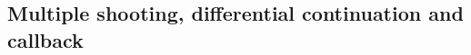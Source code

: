 \documentclass[AMA,STIX1COL]{WileyNJD-v2}
\newcommand{\mybar}[1]{#1}
\begin{document}
\subsection{Multiple shooting, differential continuation and callback} \label{ssec:homotopy}
%
\end{document}
